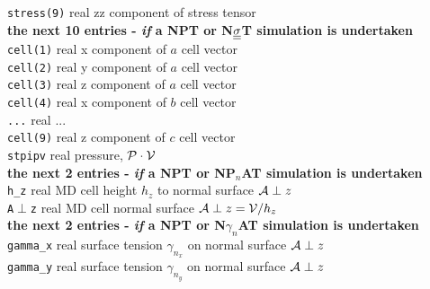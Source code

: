 \begin{tabbing}
\> {\tt stress(9)} \> real \> zz component of stress tensor \\
{\bf the next 10 entries - {\em if} a NPT or N$\mbox{$\underline{\underline{\bf \sigma}}$}$T simulation is undertaken} \\
\> {\tt cell(1)} \> real   \> x component of $a$ cell vector \\
\> {\tt cell(2)} \> real   \> y component of $a$ cell vector \\
\> {\tt cell(3)} \> real   \> z component of $a$ cell vector \\
\> {\tt cell(4)} \> real   \> x component of $b$ cell vector \\
\> {\tt ...} \> real \> ... \\
\> {\tt cell(9)} \> real   \> z component of $c$ cell vector \\
\> {\tt stpipv} \> real    \> pressure, ${\cal P} \cdot {\cal V}$ \\
{\bf the next 2 entries - {\em if} a NPT or NP$_{n}$AT simulation is undertaken} \\
\> {\tt h\_z}   \> real    \> MD cell height $h_{z}$ to normal surface ${\cal A}\perp{z}$ \\
\> {\tt A$\perp${z}} \> real \> MD cell normal surface ${\cal A}\perp{z}={\cal V}/h_{z}$ \\
{\bf the next 2 entries - {\em if} a NPT or N$\gamma_{n}$AT simulation is undertaken} \\
\> {\tt gamma\_x} \> real \> surface tension $\gamma_{n_{x}}$ on normal surface ${\cal A}\perp{z}$ \\
\> {\tt gamma\_y} \> real \> surface tension $\gamma_{n_{y}}$ on normal surface ${\cal A}\perp{z}$
\end{tabbing}
